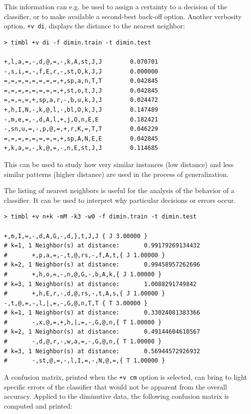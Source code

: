 \documentclass{book}
\begin{document}
This information can e.g. be used to assign a certainty to a decision
of the classifier, or to make available a second-best back-off
option. Another verbosity option, {\tt +v di}, displays the distance
to the nearest neighbor:

{\footnotesize
\begin{verbatim}
> timbl +v di -f dimin.train -t dimin.test

+,l,a,=,-,d,@,=,-,k,A,st,J,J        0.070701
-,s,i,=,-,f,E,r,-,st,O,k,J,J        0.000000
=,=,=,=,=,=,=,=,+,sp,a,n,T,T        0.042845
=,=,=,=,=,=,=,=,+,st,o,t,J,J        0.042845
=,=,=,=,+,sp,a,r,-,b,u,k,J,J        0.024472
+,h,I,N,-,k,@,l,-,bl,O,k,J,J        0.147489
-,m,e,=,-,d,A,l,+,j,O,n,E,E         0.182421
-,sn,u,=,-,p,@,=,+,r,K,=,T,T        0.046229
=,=,=,=,=,=,=,=,+,sp,A,N,E,E        0.042845
+,k,a,=,-,k,@,=,-,n,E,st,J,J        0.114685
\end{verbatim}
}

This can be used to study how very similar instances (low distance) and
less similar patterns (higher distance) are used in the process of
generalization.

The listing of nearest neighbors is useful for the analysis of the
behavior of a classifier. It can be used to interpret why particular
decisions or errors occur.

{\footnotesize
\begin{verbatim}
> timbl +v n+k -mM -k3 -w0 -f dimin.train -t dimin.test

+,m,I,=,-,d,A,G,-,d,},t,J,J { J 3.00000 }
# k=1, 1 Neighbor(s) at distance:       0.99179269134432
#       +,p,a,=,-,t,@,rs,-,f,A,t,{ J 1.00000 }
# k=2, 1 Neighbor(s) at distance:       0.99458957262696
#       +,h,o,=,-,n,@,G,-,b,A,k,{ J 1.00000 }
# k=3, 1 Neighbor(s) at distance:       1.0088291749842
#       +,h,E,r,-,d,@,rs,-,t,A,s,{ J 1.00000 }
-,t,@,=,-,l,|,=,-,G,@,n,T,T { T 3.00000 }
# k=1, 1 Neighbor(s) at distance:       0.33024081383366
#       -,x,@,=,+,h,|,=,-,G,@,n,{ T 1.00000 }
# k=2, 1 Neighbor(s) at distance:       0.49144604610567
#       -,d,@,r,-,w,a,=,-,G,@,n,{ T 1.00000 }
# k=3, 1 Neighbor(s) at distance:       0.56944572926932
#       -,st,@,=,-,l,I,=,-,N,@,=,{ T 1.00000 }
\end{verbatim}
}

A confusion matrix, printed when the {\tt +v cm} option is selected,
can bring to light specific errors of the classifier that would not be
apparent from the overall accuracy. Applied to the diminutive data,
the following confusion matrix is computed and printed:
\end{document}
